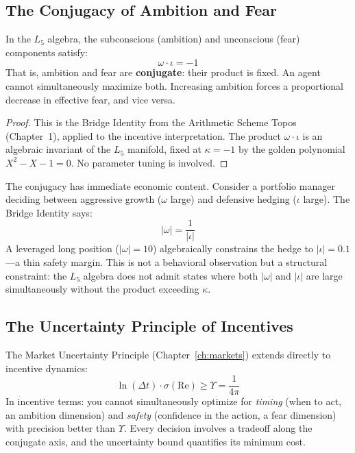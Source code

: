 \subsection{The Conjugacy of Ambition and Fear}

\begin{theorem}\label{thm:conjugacy}
In the $L_5$ algebra, the subconscious (ambition) and unconscious (fear) components satisfy:
\begin{equation}\label{eq:bridge_incentive}
    \omega \cdot \iota = -1
\end{equation}
That is, ambition and fear are \textbf{conjugate}: their product is fixed. An agent cannot simultaneously maximize both. Increasing ambition forces a proportional decrease in effective fear, and vice versa.
\end{theorem}

\begin{proof}
This is the Bridge Identity from the Arithmetic Scheme Topos (Chapter~1), applied to the incentive interpretation. The product $\omega \cdot \iota$ is an algebraic invariant of the $L_5$ manifold, fixed at $\kappa = -1$ by the golden polynomial $X^2 - X - 1 = 0$. No parameter tuning is involved. \qedhere
\end{proof}

The conjugacy has immediate economic content. Consider a portfolio manager deciding between aggressive growth ($\omega$ large) and defensive hedging ($\iota$ large). The Bridge Identity says:
\begin{equation}
    |\omega| = \frac{1}{|\iota|}
\end{equation}
A leveraged long position ($|\omega| = 10$) algebraically constrains the hedge to $|\iota| = 0.1$---a thin safety margin. This is not a behavioral observation but a structural constraint: the $L_5$ algebra does not admit states where both $|\omega|$ and $|\iota|$ are large simultaneously without the product exceeding $\kappa$.

\subsection{The Uncertainty Principle of Incentives}

The Market Uncertainty Principle (Chapter~\ref{ch:markets}) extends directly to incentive dynamics:
\begin{equation}
    \ln(\Delta t) \cdot \sigma(\mathrm{Re}) \geq \Upsilon = \frac{1}{4\pi}
\end{equation}
In incentive terms: you cannot simultaneously optimize for \emph{timing} (when to act, an ambition dimension) and \emph{safety} (confidence in the action, a fear dimension) with precision better than $\Upsilon$. Every decision involves a tradeoff along the conjugate axis, and the uncertainty bound quantifies its minimum cost.

